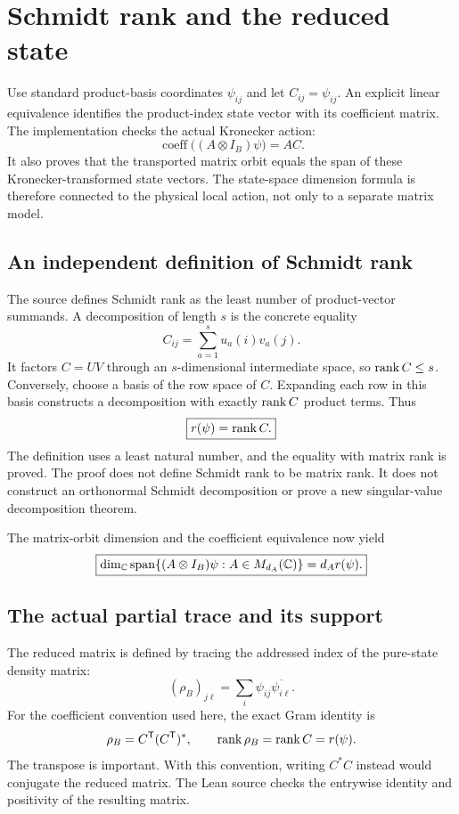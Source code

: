\section{Schmidt rank and the reduced state}\label{supp3:section:002}
Use standard product-basis coordinates $\psi_{ij}$ and let $C_{ij}=\psi_{ij}$. An explicit linear equivalence identifies the product-index state vector with its coefficient matrix. The implementation checks the actual Kronecker action:
\[
\operatorname{coeff}\bigl((A\otimes I_B)\psi\bigr)=AC.
\]
It also proves that the transported matrix orbit equals the span of these Kronecker-transformed state vectors. The state-space dimension formula is therefore connected to the physical local action, not only to a separate matrix model.

\subsection{An independent definition of Schmidt rank}
The source defines Schmidt rank as the least number of product-vector summands. A decomposition of length $s$ is the concrete equality
\[
C_{ij}=\sum_{a=1}^{s}u_a(i)v_a(j).
\]
It factors $C=UV$ through an $s$-dimensional intermediate space, so $\operatorname{rank} C\le s$. Conversely, choose a basis of the row space of $C$. Expanding each row in this basis constructs a decomposition with exactly $\operatorname{rank} C$ product terms. Thus
\[
\boxed{r(\psi)=\operatorname{rank} C.}
\]
The definition uses a least natural number, and the equality with matrix rank is proved. The proof does not define Schmidt rank to be matrix rank. It does not construct an orthonormal Schmidt decomposition or prove a new singular-value decomposition theorem.

The matrix-orbit dimension and the coefficient equivalence now yield
\[
\boxed{\dim_\C\spanof\{(A\otimes I_B)\psi:A\in M_{d_A}(\C)\}
=d_A r(\psi).}
\]

\subsection{The actual partial trace and its support}
The reduced matrix is defined by tracing the addressed index of the pure-state density matrix:
\[
(\rho_B)_{j\ell}=\sum_i\psi_{ij}\overline{\psi_{i\ell}}.
\]
For the coefficient convention used here, the exact Gram identity is
\[
\rho_B=C^{\mathsf T}(C^{\mathsf T})^*,
\qquad \rank\rho_B=\rank C=r(\psi).
\]
The transpose is important. With this convention, writing $C^*C$ instead would conjugate the reduced matrix. The Lean source checks the entrywise identity and positivity of the resulting matrix.

